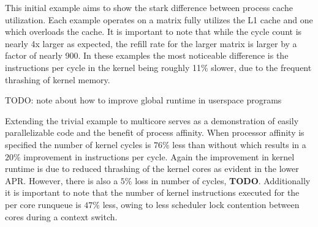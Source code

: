 \documentclass[11pt, twocolumn]{proc}
\begin{document}
This initial example aims to show the stark difference between process cache utilization.  Each example operates on a matrix fully utilizes the L1 cache and one which overloads the cache.  It is important to note that while the cycle count is nearly 4x larger as expected, the refill rate for the larger matrix is larger by a factor of nearly 900.  In these examples the most noticeable difference is the instructions per cycle in the kernel being roughly 11\% slower, due to the frequent thrashing of kernel memory. 

TODO: note about how to improve global runtime in userspace programs

\begin{table}[h!]
    \centering
    \caption{multi core - global queue}
\end{table}

\begin{table}[h!]
    \centering
    \caption{multi core - cpu queue (affinity)}
\end{table}

Extending the trivial example to multicore serves as a demonstration of easily parallelizable code and the benefit of process affinity.  When processor affinity is specified the number of kernel cycles is $76\%$ less than without which results in a $20\%$ improvement in instructions per cycle.  Again the improvement in kernel runtime is due to reduced thrashing of the kernel cores as evident in the lower APR.  However, there is also a $5\%$ loss in number of cycles, \textbf{TODO}.  Additionally it is important to note that the number of kernel instructions executed for the per core runqueue is $47\%$ less, owing to less scheduler lock contention between cores during a context switch.
\end{document}
